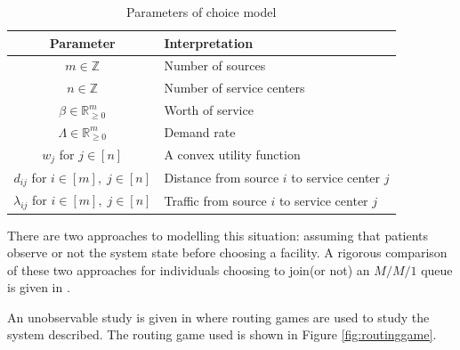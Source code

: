 \documentclass[a4paper,11pt]{article}
\begin{document}
\begin{table}[!hbtp]
\begin{center}
\begin{tabular}{cl}
\toprule
Parameter & Interpretation\\
\midrule
$m\in\mathbb{Z}$& Number of sources\\
$n\in\mathbb{Z}$& Number of service centers\\
$\beta\in\mathbb{R}_{\geq 0}^{m}$& Worth of service\\
$\Lambda\in\mathbb{R}_{\geq 0}^{m}$& Demand rate\\
$w_j$ for $j\in[n]$& A convex utility function\\
$d_{ij}$ for $i\in[m],\;j\in[n]$& Distance from source $i$ to service center $j$\\
$\lambda_{ij}$ for $i\in[m],\;j\in[n]$& Traffic from source $i$ to service center $j$\\
\toprule
\end{tabular}
\caption{Parameters of choice model}\label{tab:parameters}
\end{center}
\end{table}

There are two approaches to modelling this situation: assuming that patients observe or not the system state before choosing a facility.
A rigorous comparison of these two approaches for individuals choosing to join(or not) an $M/M/1$ queue is given in \cite{shone2013comparisons}.

An unobservable study is given in \cite{Knight2013} where routing games \cite{Roughgarden2005} are used to study the system described.
The routing game used is shown in Figure \ref{fig:routinggame}.
\end{document}
